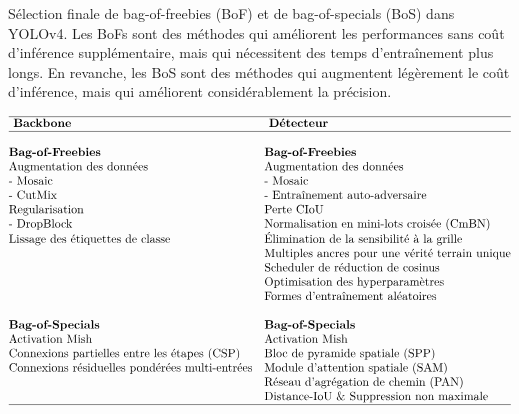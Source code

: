 \documentclass{article}
\begin{document}
\begin{table}[htbp]
\centering
\caption{Sélection finale de bag-of-freebies (BoF) et de bag-of-specials (BoS) dans YOLOv4. Les BoFs sont des méthodes qui améliorent les performances sans coût d'inférence supplémentaire, mais qui nécessitent des temps d'entraînement plus longs. En revanche, les BoS sont des méthodes qui augmentent légèrement le coût d'inférence, mais qui améliorent considérablement la précision.}
\label{tab:3}
\begin{adjustbox}{width=0.9\textwidth}
$\begin{array}{@{}ll@{}}
\hline \textbf{ Backbone } & \textbf{ Détecteur } \\
\hline\\
\textbf{Bag-of-Freebies} & \textbf{Bag-of-Freebies} \\
\text{Augmentation des données} & \text{Augmentation des données} \\
\text{- Mosaic} & \text{- Mosaic} \\
\text{- CutMix} & \text{- Entraînement auto-adversaire} \\
\text{Regularisation} & \text{Perte CIoU} \\
\text{- DropBlock} & \text{Normalisation en mini-lots croisée (CmBN)} \\
\text{Lissage des étiquettes de classe} & \text{Élimination de la sensibilité à la grille} \\
& \text{Multiples ancres pour une vérité terrain unique} \\
& \text{Scheduler de réduction de cosinus} \\
& \text{Optimisation des hyperparamètres} \\
& \text{Formes d'entraînement aléatoires} \\
\\
\textbf{Bag-of-Specials} & \textbf{Bag-of-Specials} \\
\text{Activation Mish} & \text{Activation Mish} \\
\text{Connexions partielles entre les étapes (CSP)} & \text{Bloc de pyramide spatiale (SPP)} \\
\text{Connexions résiduelles pondérées multi-entrées} & \text{Module d'attention spatiale (SAM)} \\
& \text{Réseau d'agrégation de chemin (PAN)} \\
& \text{Distance-IoU \& Suppression non maximale} \\
\hline
\end{array}$
\end{adjustbox}
\end{table}
\end{document}
